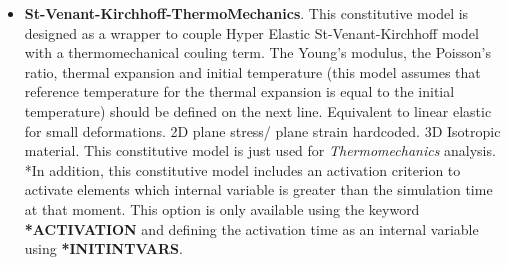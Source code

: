 \documentclass[oneside,11pt,times]{book}
\begin{document}
\begin{enumerate}
\begin{itemize}
   \item \textbf{St-Venant-Kirchhoff-ThermoMechanics}. This constitutive model is designed as a wrapper to couple Hyper Elastic St-Venant-Kirchhoff model with a thermomechanical couling term. The Young's modulus, the Poisson's ratio, thermal expansion and initial temperature (this model assumes that reference temperature for the thermal expansion is equal to the initial temperature) should be defined on the next line. Equivalent to linear elastic for small deformations. 2D plane stress/ plane strain hardcoded. 3D Isotropic material. This constitutive model is just used for \textit{Thermomechanics} analysis. \\ *In addition, this constitutive model includes an activation criterion to activate elements which internal variable is greater than the simulation time at that moment. This option is only available using the keyword  \textbf{*ACTIVATION} and defining the activation time as an internal variable using \textbf{*INITINTVARS}.


\end{itemize}
\end{enumerate}
\end{document}
